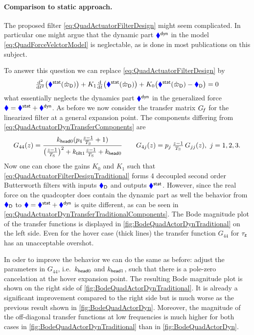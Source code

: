 \paragraph{Comparison to static approach.}
The proposed filter \eqref{eq:QuadActuatorFilterDesign} might seem complicated.
In particular one might argue that the dynamic part $\textcolor{blue}{\blacklozenge}^{\mathsf{dyn}}$ in the model \eqref{eq:QuadForceVelctorModel} is neglectable, as is done in most publications on this subject.

To answer this question we can replace \eqref{eq:QuadActuatorFilterDesign} by
\begin{align}\label{eq:QuadActuatorFilterDesignTraditional}
 \tfrac{\mathrm{d}^2}{\mathrm{d} t^2} \big(\textcolor{blue}{\blacklozenge}^{\mathsf{stat}}(\hat{\varpi}_{\mathsf{D}})\big) + K_1 \tfrac{\mathrm{d}}{\mathrm{d} t} \big(\textcolor{blue}{\blacklozenge}^{\mathsf{stat}}(\hat{\varpi}_{\mathsf{D}})\big) + K_0 \big( \textcolor{blue}{\blacklozenge}^{\mathsf{stat}}(\hat{\varpi}_{\mathsf{D}}) - \textcolor{blue}{\blacklozenge}_{\mathsf{D}} \big) = 0
\end{align}
what essentially neglects the dynamics part $\textcolor{blue}{\blacklozenge}^{\mathsf{dyn}}$ in the generalized force $\textcolor{blue}{\blacklozenge} = \textcolor{blue}{\blacklozenge}^{\mathsf{stat}} + \textcolor{blue}{\blacklozenge}^{\mathsf{dyn}}$.
As before we now consider the transfer matrix $G_{\hspace{-0.3ex}f}$ for the linearized filter at a general expansion point.
The components differing from \eqref{eq:QuadActuatorDynTransferComponents} are
\begin{align}\label{eq:QuadActuatorDynTransferTraditionalComponents}
 G_{44}(z) = \frac{k_{\mathsf{head}0}(p_4\tfrac{z-1}{T_{\mathrm{S}}} + 1)}{\big(\tfrac{z-1}{T_{\mathrm{S}}}\big)^2 + k_{\mathsf{tilt}1} \tfrac{z-1}{T_{\mathrm{S}}} + k_{\mathsf{head}0}}
\qquad
 G_{4j}(z) = p_j\,\tfrac{z-1}{T_{\mathrm{S}}}\,G_{jj}(z), \ j=1,2,3.
\end{align}
Now one can chose the gains $K_0$ and $K_1$ such that \eqref{eq:QuadActuatorFilterDesignTraditional} forms 4 decoupled second order Butterworth filters with inputs $\textcolor{blue}{\blacklozenge}_{\mathsf{D}}$ and outputs $\textcolor{blue}{\blacklozenge}^{\mathsf{stat}}$.
However, since the real force on the quadcopter does contain the dynamic part as well the behavior from $\textcolor{blue}{\blacklozenge}_{\mathsf{D}}$ to $\textcolor{blue}{\blacklozenge} = \textcolor{blue}{\blacklozenge}^{\mathsf{stat}} + \textcolor{blue}{\blacklozenge}^{\mathsf{dyn}}$ is quite different, as can be seen in \eqref{eq:QuadActuatorDynTransferTraditionalComponents}.
The Bode magnitude plot of the transfer functions is displayed in \autoref{fig:BodeQuadActorDynTraditional} on the left side.
Even for the hover case (thick lines) the transfer function $G_{44}$ for $\tau_{\mathsf{z}}$ has an unacceptable overshot.

In oder to improve the behavior we can do the same as before: adjust the parameters in $G_{44}$, i.e.\ $k_{\mathsf{head}0}$ and $k_{\mathsf{head}1}$, such that there is a pole-zero cancelation at the hover expansion point.
The resulting Bode magnitude plot is shown on the right side of \autoref{fig:BodeQuadActorDynTraditional}.
It is already a significant improvement compared to the right side but is much worse as the previous result shown in \autoref{fig:BodeQuadActorDyn}.
Moreover, the magnitude of the off-diagonal transfer functions at low frequencies is much higher for both cases in \autoref{fig:BodeQuadActorDynTraditional} than in \autoref{fig:BodeQuadActorDyn}.

